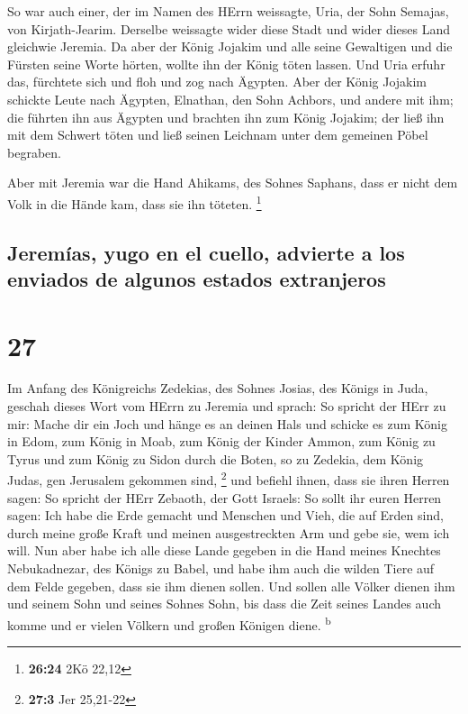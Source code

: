  So war auch einer, der im Namen des HErrn weissagte,
Uria, der Sohn Semajas, von Kirjath-Jearim. Derselbe weissagte wider
diese Stadt und wider dieses Land gleichwie Jeremia.  Da
aber der König Jojakim und alle seine Gewaltigen und die Fürsten seine
Worte hörten, wollte ihn der König töten lassen. Und Uria erfuhr das,
fürchtete sich und floh und zog nach Ägypten.  Aber der
König Jojakim schickte Leute nach Ägypten, Elnathan, den Sohn Achbors,
und andere mit ihm;  die führten ihn aus Ägypten und
brachten ihn zum König Jojakim; der ließ ihn mit dem Schwert töten und
ließ seinen Leichnam unter dem gemeinen Pöbel begraben.

 Aber mit Jeremia war die Hand Ahikams, des Sohnes
Saphans, dass er nicht dem Volk in die Hände kam, dass sie ihn töteten.
\footnote{\textbf{26:24} 2Kö 22,12}

\hypertarget{jeremuxedas-yugo-en-el-cuello-advierte-a-los-enviados-de-algunos-estados-extranjeros}{%
\subsection{Jeremías, yugo en el cuello, advierte a los enviados de
algunos estados
extranjeros}\label{jeremuxedas-yugo-en-el-cuello-advierte-a-los-enviados-de-algunos-estados-extranjeros}}

\hypertarget{section-26}{%
\section{27}\label{section-26}}

 Im Anfang des Königreichs Zedekias, des Sohnes Josias,
des Königs in Juda, geschah dieses Wort vom HErrn zu Jeremia und sprach:
 So spricht der HErr zu mir: Mache dir ein Joch und hänge
es an deinen Hals  und schicke es zum König in Edom, zum
König in Moab, zum König der Kinder Ammon, zum König zu Tyrus und zum
König zu Sidon durch die Boten, so zu Zedekia, dem König Judas, gen
Jerusalem gekommen sind, \footnote{\textbf{27:3} Jer 25,21-22}
 und befiehl ihnen, dass sie ihren Herren sagen: So
spricht der HErr Zebaoth, der Gott Israels: So sollt ihr euren Herren
sagen:  Ich habe die Erde gemacht und Menschen und Vieh,
die auf Erden sind, durch meine große Kraft und meinen ausgestreckten
Arm und gebe sie, wem ich will.  Nun aber habe ich alle
diese Lande gegeben in die Hand meines Knechtes Nebukadnezar, des Königs
zu Babel, und habe ihm auch die wilden Tiere auf dem Felde gegeben, dass
sie ihm dienen sollen.  Und sollen alle Völker dienen ihm
und seinem Sohn und seines Sohnes Sohn, bis dass die Zeit seines Landes
auch komme und er vielen Völkern und großen Königen diene.
\textsuperscript{b}

